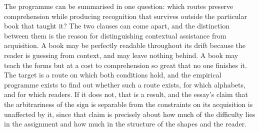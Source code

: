 The programme can be summarised in one question: which routes preserve comprehension while producing recognition that survives outside the particular book that taught it? The two clauses can come apart, and the distinction between them is the reason for distinguishing contextual assistance from acquisition. A book may be perfectly readable throughout its drift because the reader is guessing from context, and may leave nothing behind. A book may teach the forms but at a cost to comprehension so great that no one finishes it. The target is a route on which both conditions hold, and the empirical programme exists to find out whether such a route exists, for which alphabets, and for which readers. If it does not, that is a result, and the essay's claim that the arbitrariness of the sign is separable from the constraints on its acquisition is unaffected by it, since that claim is precisely about how much of the difficulty lies in the assignment and how much in the structure of the shapes and the reader.
